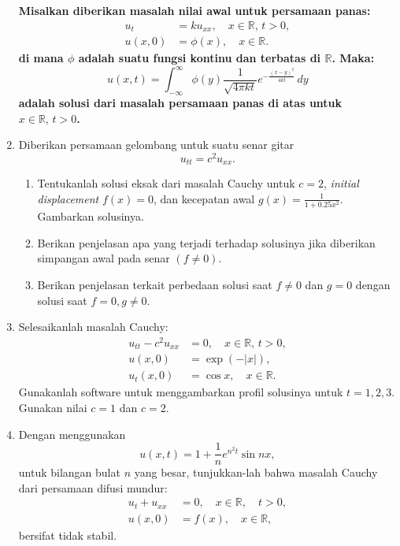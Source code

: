 \documentclass{article}
\begin{document}
\begin{enumerate}
\textbf{Misalkan diberikan masalah nilai awal untuk persamaan panas:  
\begin{align*}  
u_t &= k u_{xx}, \quad x \in \mathbb{R}, \, t > 0, \\  
u(x, 0) &= \phi(x), \quad x \in \mathbb{R}.  
\end{align*}  
di mana \(\phi\) adalah suatu fungsi kontinu dan terbatas di \(\mathbb{R}\). Maka:  
\[  
u(x, t) = \int_{-\infty}^{\infty} \phi(y) \frac{1}{\sqrt{4 \pi kt}} e^{-\frac{(x-y)^2}{4kt}} \, dy  
\]  
adalah solusi dari masalah persamaan panas di atas untuk \(x \in \mathbb{R}, \, t > 0\).}

\item  Diberikan persamaan gelombang untuk suatu senar gitar  
\[
u_{tt} = c^2 u_{xx}.
\]  
\begin{enumerate}
\item Tentukanlah solusi eksak dari masalah Cauchy untuk \( c = 2 \), \textit{initial displacement} \( f(x) = 0 \), dan kecepatan awal \( g(x) = \frac{1}{1+0.25x^2} \). Gambarkan solusinya.  
\item Berikan penjelasan apa yang terjadi terhadap solusinya jika diberikan simpangan awal pada senar \( (f \neq 0) \).  
\item Berikan penjelasan terkait perbedaan solusi saat \( f \neq 0 \) dan \( g = 0 \) dengan solusi saat \( f = 0, g \neq 0 \).  
\end{enumerate}

\item Selesaikanlah masalah Cauchy:  
\begin{align*}
u_{tt} - c^2 u_{xx} &= 0, \quad x \in \mathbb{R}, \, t > 0, \\
u(x, 0) &= \exp(-|x|), \\
u_t(x, 0) &= \cos x, \quad x \in \mathbb{R}.
\end{align*}  
Gunakanlah software untuk menggambarkan profil solusinya untuk \( t = 1, 2, 3 \). Gunakan nilai \( c = 1 \) dan \( c = 2 \).  

\item Dengan menggunakan  
\[
u(x, t) = 1 + \frac{1}{n} e^{n^2 t} \sin nx,
\]  
untuk bilangan bulat \( n \) yang besar, tunjukkan-lah bahwa masalah Cauchy dari persamaan difusi mundur:  
\begin{align*}
u_t + u_{xx} &= 0, \quad x \in \mathbb{R}, \quad t > 0, \\
u(x, 0) &= f(x), \quad x \in \mathbb{R},
\end{align*}  
bersifat tidak stabil.


\end{enumerate}
\end{document}
